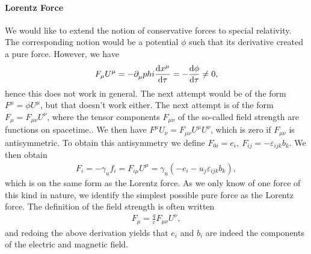 \paragraph{Lorentz Force}
We would like to extend the notion of conservative forces to special relativity. The corresponding notion would be a potential $\phi$ such that its derivative created a pure force. However, we have
\begin{align*}
	F_{\mu}U^{\mu} = -\partial^{}_{\mu}phi\dv{x^{\mu}}{\tau} = -\dv{\phi}{\tau} \neq 0,
\end{align*}
hence this does not work in general. The next attempt would be of the form $F^{\mu} = \phi U^{\mu}$, but that doesn't work either. The next attempt is of the form $F_{\mu} = F_{\mu\nu}U^{\nu}$, where the tensor components $F_{\mu\nu}$ of the so-called field strength are functions on spacetime..
We then have $F^{\mu}U_{\nu} = F_{\mu\nu}U^{\mu}U^{\nu}$, which is zero if $F_{\mu\nu}$ is antisymmetric. To obtain this antisymmetry we define $F_{0i} = e_{i},\ F_{ij} = -\varepsilon_{ijk}b_{k}$. We then obtain
\begin{align*}
	F_{i} = -\gamma_{u}f_{i} = F_{i\mu}U^{\mu} = \gamma_{u}(-e_{i} - u_{j}\varepsilon_{ijk}b_{k}),
\end{align*}
which is on the same form as the Lorentz force. As we only know of one force of this kind in nature, we identify the simplest possible pure force as the Lorentz force. The definition of the field strength is often written
\begin{align*}
	F_{\mu} = \frac{q}{c}F_{\mu\nu}U^{\nu},
\end{align*}
and redoing the above derivation yields that $e_{i}$ and $b_{i}$ are indeed the components of the electric and magnetic field.